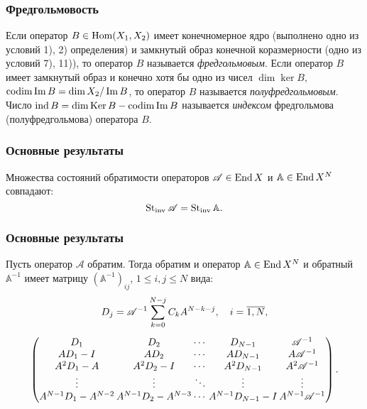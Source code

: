 \documentclass{beamer}
\begin{document}
\begin{frame}
\frametitle{Фредгольмовость}
\begin{definition}
Если оператор $B \in \operatorname{Hom}(X_1, X_2)$ имеет конечномерное ядро (выполнено одно из условий 1), 2) определения) и замкнутый образ конечной коразмерности (одно из условий 7), 11)), то оператор $B$ называется \emph{фредгольмовым}. Если оператор $B$ имеет замкнутый образ и конечно хотя бы одно из чисел $\dim \ker B$, $\operatorname{codim} \operatorname{Im} B = \dim X_2 / \operatorname{Im} B$, то оператор $B$ называется \emph{полуфредгольмовым}. Число $\operatorname{ind} B = \dim \operatorname{Ker} B - \operatorname{codim} \operatorname{Im} B$ называется \emph{индексом} фредгольмова (полуфредгольмова) оператора $B$.
\end{definition}
\end{frame}

\begin{frame}
\frametitle{Основные результаты}

\begin{theorem}
    Множества состояний обратимости операторов $ \mathcal A \in \operatorname{End}{X}$ и $\mathbb A \in \operatorname{End}{X^{N}}$ совпадают:
    \[ \operatorname{St_{inv}}{\mathcal A} = \operatorname{St_{inv}}{\mathbb A}. \]
\end{theorem}

\end{frame}

\begin{frame}
\frametitle{Основные результаты}

\begin{theorem}\label{th:inverse}
    Пусть оператор $\mathcal A$ обратим. Тогда обратим и оператор $\mathbb A \in \operatorname{End} X^N$ и обратный $\mathbb A^{-1}$ имеет матрицу $(\mathbb A^{-1})_{ij}$, $1 \leq i, j \leq N$ вида:
    \begin{gather*}
        D_j = \mathcal A^{-1} \sum_{k = 0}^{N-j} C_k A^{N-k-j}, \quad i = \overline{1,N},\\[0.5em]
        \begingroup
        \renewcommand*{\arraycolsep}{1pt}
        \begin{pmatrix}
          D_1 &  D_2 &  \cdots & D_{N-1} &  \mathcal A^{-1} \\
          A D_1 - I & A D_2 & \cdots & A D_{N-1} & A  \mathcal A^{-1} \\
          A^2 D_1 - A & A^2 D_2 - I & \cdots & A^2 D_{N-1} & A^2 \mathcal A^{-1} \\
          \vdots & \vdots & \ddots & \vdots & \vdots \\
          A^{N-1} D_1 - A^{N-2} & A^{N-1} D_2 - A^{N-3} & \cdots & A^{N-1} D_{N-1} - I & A^{N-1}  \mathcal A^{-1}
       \end{pmatrix}
       \endgroup.
    \end{gather*}
\end{theorem}

\end{frame}
\end{document}
